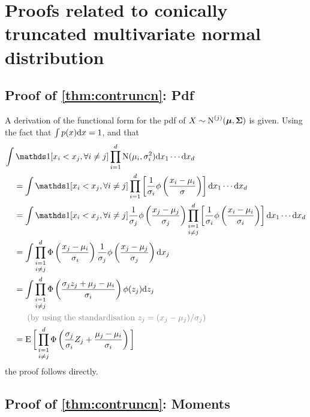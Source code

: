 \section{Proofs related to conically truncated multivariate normal distribution}
\label{apx:contrunproof}

\subsection{Proof of \cref{thm:contruncn}: Pdf}

A derivation of the functional form for the pdf of $X \sim \operatorname{N}^{(j)}({\bm\mu}, {\bm\Sigma})$ is given. Using the fact that $\int p(x) \text{d} x = 1$, and that
  \begin{align*}
    \int &\ind[x_i < x_j, \forall i \neq j] \prod_{i=1}^d \N(\mu_i, \sigma_i^2) \d x_1 \cdots \d x_d \\*
    &=  \int \ind[x_i < x_j, \forall i \neq j] \prod_{i=1}^d \left[ \frac{1}{\sigma_i} \phi \left( \frac{x_i-\mu_i}{\sigma} \right) \right] \d x_1 \cdots \d x_d \\
    &=  \int \ind[x_i < x_j, \forall i \neq j] \frac{1}{\sigma_j} \phi \left( \frac{x_j-\mu_j}{\sigma_j} \right)\mathop{\prod_{i=1}^d}_{i \neq j} \left[ \frac{1}{\sigma_i} \phi \left( \frac{x_i-\mu_i}{\sigma_i} \right) \right] \d x_1 \cdots \d x_d \\    
    &= \int \mathop{\prod_{i=1}^d}_{i \neq j} \Phi \left(\frac{x_j - \mu_i}{\sigma_i} \right) \frac{1}{\sigma_j} \phi \left( \frac{x_j-\mu_j}{\sigma_j} \right) \d x_j \\
    &= \int \mathop{\prod_{i=1}^d}_{i \neq j} \Phi \left(\frac{\sigma_j z_j + \mu_j - \mu_i}{\sigma_i} \right) \phi(z_j) \d z_j \\
    &\phantom{==} {\color{gray} (\text{by using the standardisation } z_j = (x_j - \mu_j) / \sigma_j)} \\    
    &= \E \bigg[ \mathop{\prod_{i=1}^d}_{i \neq j} \Phi \left(\frac{\sigma_j}{\sigma_i}Z_j + \frac{\mu_j - \mu_i}{\sigma_i} \right) \bigg] \\
  \end{align*}
  the proof follows directly.


\subsection{Proof of \cref{thm:contruncn}: Moments}

